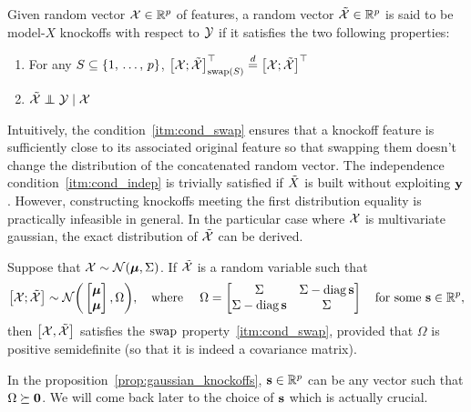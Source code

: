 \begin{definition}
    Given random vector $\mathcal{X} \in \mathbb{R}^p$ of features,
    a random vector $\tilde{\mathcal{X}} \in \mathbb{R}^p$ is said to be model-$X$ knockoffs with respect to $\mathcal{Y}$
    if it satisfies the two following properties:
    \begin{enumerate}[label=\textbf{S.\arabic*},ref=S.\arabic*]
        \item \label{itm:cond_swap} For any $S \subseteq \left\{ 1,\, \dots,\, p \right\}$,
            $\big[ \mathcal{X}; \tilde{\mathcal{X}} \big]^\top_{\operatorname{swap}(S)} \stackrel{d}{=} \big[ \mathcal{X}; \tilde{\mathcal{X}} \big]^\top$
        \item \label{itm:cond_indep} $\tcX \independent \cY \mid \cX$
    \end{enumerate}
\end{definition}
Intuitively, the condition~\ref{itm:cond_swap} ensures that a knockoff feature is sufficiently
close to its associated original feature so that swapping them doesn't change the distribution of the
concatenated random vector.
The independence condition~\ref{itm:cond_indep} is trivially satisfied if $\tilde{X}$ is built without exploiting $\mathbf{y}$.
However, constructing knockoffs meeting the first distribution equality is practically infeasible in general.
In the particular case where $\mathcal{X}$ is multivariate gaussian, the exact distribution of $\tilde{\mathcal{X}}$ can be derived.
\begin{proposition}
    Suppose that $\mathcal{X} \sim \mathcal{N}(\bm{\mu}, \Sigma)$.
    If $\tilde{\mathcal{X}}$ is a random variable such that
    \begin{equation*}
        \big[ \mathcal{X}; \tilde{\mathcal{X}} \big] \sim \mathcal{N}\bigg(\begin{bmatrix} \bm{\mu}\\ \bm{\mu} \end{bmatrix}, \Omega\bigg)
        ,\quad\text{where }\quad
        \Omega = \begin{bmatrix}
             \Sigma & \Sigma - \operatorname*{diag} \mathbf{s}\\
             \Sigma - \operatorname*{diag} \mathbf{s} & \Sigma
        \end{bmatrix}
        \quad\text{for some }
        \mathbf{s} \in \mathbb{R}^p,
    \end{equation*}
    then $\big[\mathcal{X}, \tilde{\mathcal{X}} \big]$ satisfies the $\operatorname{swap}$ property~\ref{itm:cond_swap},
    provided that $\Omega$ is positive semidefinite (so that it is indeed a covariance matrix).
\end{proposition}\label{prop:gaussian_knockoffs}
In the proposition~\ref{prop:gaussian_knockoffs},
$\mathbf{s} \in \mathbb{R}^p$ can be any vector such that $\Omega \succeq \mathbf{0}$.
We will come back later to the choice of $\mathbf{s}$ which is actually crucial.
